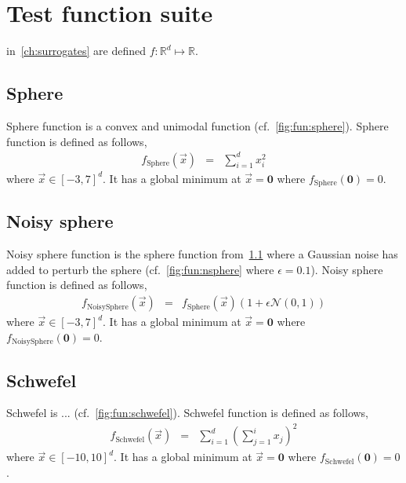 
\chapter{Test function suite}\label{app:fun} 
 in~\cref{ch:surrogates} are defined $f:\mathbb{R}^d\mapsto\mathbb{R}$.


\section{Sphere }\label{app:fun:sphere}
Sphere function is a convex and unimodal function (cf.~\cref{fig:fun:sphere}). Sphere function is defined as follows,
\begin{eqnarray}
f_{\textrm{Sphere}}(\vec{x})&=&\sum_{i=1}^d x_i^2
\end{eqnarray} where $\vec{x}\in[-3,7]^d$.
It has a global minimum at $\vec{x}=\textbf{0}$ where $f_{\textrm{Sphere}}(\textbf{0})=0$. 

\section{Noisy sphere}\label{app:fun:nsphere}
Noisy sphere function is the sphere function from~\cref{app:fun:sphere} where a Gaussian noise has added to perturb the sphere (cf.~\cref{fig:fun:nsphere} where $\epsilon=0.1$). Noisy sphere function is defined as follows,
\begin{eqnarray}
f_{\textrm{NoisySphere}}(\vec{x})&=&f_{\textrm{Sphere}}(\vec{x})\left(1+\epsilon\mathcal{N}(0,1)\right)
\end{eqnarray} where $\vec{x}\in[-3,7]^d$.
It has a global minimum at $\vec{x}=\textbf{0}$ where $f_{\textrm{NoisySphere}}(\textbf{0})=0$.

\section{Schwefel}\label{app:fun:schwefel}
Schwefel is ... (cf.~\cref{fig:fun:schwefel}). Schwefel function is defined as follows,
\begin{eqnarray}
f_{\textrm{Schwefel}}(\vec{x})&=&\sum_{i=1}^d\left(\sum_{j=1}^i x_j\right)^2
\end{eqnarray} where $\vec{x}\in[-10,10]^d$.
It has a global minimum at $\vec{x}=\textbf{0}$ where $f_{\textrm{Schwefel}}(\textbf{0})=0$.

